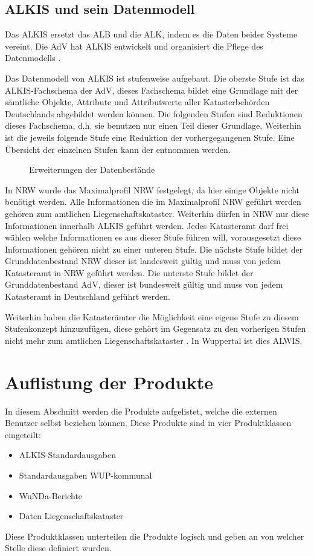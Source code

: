 \subsection{ALKIS und sein Datenmodell}
Das \acf{ALKIS} ersetzt das \acf{ALB} und die \acf{ALK}, indem es die Daten beider Systeme vereint. Die \acs{AdV} hat \acs{ALKIS} entwickelt und organisiert die Pflege des Datenmodells \autocite[vgl.][]{adv-alkis}.

Das Datenmodell von ALKIS ist stufenweise aufgebaut. Die oberste Stufe ist das ALKIS-Fachschema der AdV, dieses Fachschema bildet eine Grundlage mit der sämtliche Objekte, Attribute und Attributwerte aller Katasterbehörden Deutschlands abgebildet werden können.
Die folgenden Stufen sind Reduktionen dieses Fachschema, d.h. sie benutzen nur einen Teil dieser Grundlage. Weiterhin ist die jeweils folgende Stufe eine Reduktion der vorhergegangenen Stufe. Eine Übersicht der einzelnen Stufen kann der  entnommen werden. 

\begin{figure}[htbp]
	\centering
	\caption{Erweiterungen der Datenbestände}
	\label{fig:prod-stufen}
\end{figure}

In \ac{NRW} wurde das Maximalprofil NRW festgelegt, da hier einige Objekte nicht benötigt werden. Alle Informationen die im Maximalprofil NRW geführt werden gehören zum amtlichen Liegenschaftskataster.
Weiterhin dürfen in NRW nur diese Informationen innerhalb ALKIS geführt werden. Jedes Katasteramt darf frei wählen welche Informationen es aus dieser Stufe führen will, vorausgesetzt diese Informationen gehören nicht zu einer unteren Stufe.
Die nächste Stufe bildet der Grunddatenbestand NRW dieser ist landesweit gültig und muss von jedem Katasteramt in NRW geführt werden.
Die unterste Stufe bildet der Grunddatenbestand AdV, dieser ist bundesweit gültig und muss von jedem Katasteramt in Deutschland geführt werden.

Weiterhin haben die Katasterämter die Möglichkeit eine eigene Stufe zu diesem Stufenkonzept hinzuzufügen, diese gehört im Gegensatz zu den vorherigen Stufen nicht mehr zum amtlichen Liegenschaftskataster \autocite[vgl.][1-4]{bezk-grunddaten}. In Wuppertal ist dies ALWIS. 

\section{Auflistung der Produkte}
In diesem Abschnitt werden die Produkte aufgelistet, welche die externen Benutzer selbst beziehen können. Diese Produkte sind in vier Produktklassen eingeteilt:
\begin{itemize}
	\item ALKIS-Standardausgaben
	\item Standardausgaben WUP-kommunal
	\item WuNDa-Berichte
	\item Daten Liegenschaftskataster
\end{itemize}
Diese Produktklassen unterteilen die Produkte logisch und geben an von welcher Stelle diese definiert wurden. 

